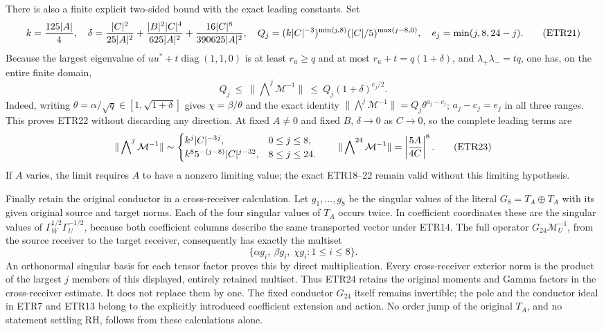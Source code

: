 \documentclass[11pt]{article}
\begin{document}
There is also a finite explicit two-sided bound with the exact leading
constants. Set
\[
 k={125|A|\over4},\quad
 \delta={|C|^2\over25|A|^2}
       +{|B|^2|C|^4\over625|A|^2}
       +{16|C|^8\over390625|A|^2},\quad
 Q_j=(k|C|^{-3})^{\min(j,8)}(|C|/5)^{\max(j-8,0)},\quad
 e_j=\min(j,8,24-j).
                                                               \tag{ETR21}
\]
Because the largest eigenvalue of $uu^*+t\operatorname{diag}(1,1,0)$
is at least $r_u\ge q$ and at most $r_u+t=q(1+\delta)$, and
$\lambda_+\lambda_-=tq$, one has, on the entire finite domain,
\[
 Q_j\ \le\ \|\mathop{\bigwedge}\nolimits^j\mathcal M^{-1}\|
       \ \le\ Q_j(1+\delta)^{e_j/2}.                    \tag{ETR22}
\]
Indeed, writing $\theta=\alpha/\sqrt q\in[1,\sqrt{1+\delta}]$ gives
$\chi=\beta/\theta$ and the exact identity
$\|\bigwedge^j\mathcal M^{-1}\|=Q_j\theta^{a_j-c_j}$;
$a_j-c_j=e_j$ in all three ranges. This proves ETR22 without discarding
any direction. At fixed $A\ne0$ and fixed $B$, $\delta\to0$ as $C\to0$,
so the complete leading terms are
\[
 \|\mathop{\bigwedge}\nolimits^j\mathcal M^{-1}\|
 \sim
 \begin{cases}
 k^j|C|^{-3j},&0\le j\le8,\\
 k^8 5^{-(j-8)}|C|^{j-32},&8\le j\le24.
 \end{cases}\qquad
 \|\mathop{\bigwedge}\nolimits^{24}\mathcal M^{-1}\|
       =\left|{5A\over4C}\right|^8.                     \tag{ETR23}
\]
If $A$ varies, the limit requires $A$ to have a nonzero limiting value;
the exact ETR18--22 remain valid without this limiting hypothesis.

Finally retain the original conductor in a cross-receiver calculation.
Let $g_1,\ldots,g_8$ be the singular values of the literal
$G_8=T_A\oplus T_A$ with its given original source and target norms.
Each of the four singular values of $T_A$ occurs twice. In coefficient
coordinates these are the singular values of
$\Gamma_W^{1/2}\Gamma_U^{-1/2}$, because both coefficient columns
describe the same transported vector under ETR14. The full operator
$G_{24}\mathcal M_U^{-1}$, from the source receiver to the target
receiver, consequently has exactly the multiset
\[
 \{\alpha g_i,\ \beta g_i,\ \chi g_i:1\le i\le8\}.    \tag{ETR24}
\]
An orthonormal singular basis for each tensor factor proves this by
direct multiplication. Every cross-receiver exterior norm is the product
of the largest $j$ members of this displayed, entirely retained
multiset. Thus ETR24 retains the original moments and Gamma factors in
the cross-receiver estimate. It does not replace them by one. The fixed
conductor $G_{24}$ itself remains invertible; the pole and the conductor
ideal in ETR7 and ETR13 belong to the explicitly introduced coefficient
extension and action. No order jump of the original $T_A$, and no
statement settling RH, follows from these calculations alone.
\end{document}
